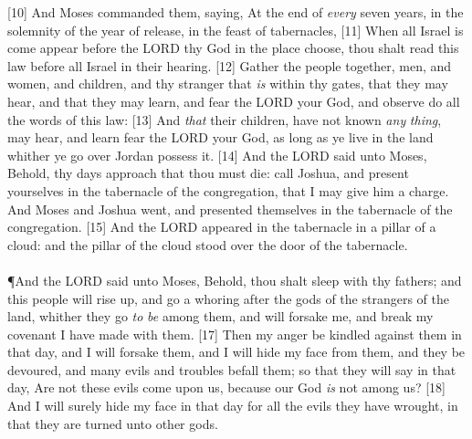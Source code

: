 [10] \textcolor[cmyk]{0.99998,1,0,0}{And Moses commanded them, saying, At the end of \emph{every} seven years, in the solemnity of the year of release, in the feast of tabernacles,}
[11] \textcolor[cmyk]{0.99998,1,0,0}{When all Israel is come   appear before the LORD thy God in the place      choose, thou shalt read this law before all Israel in their hearing.}
[12] \textcolor[cmyk]{0.99998,1,0,0}{Gather the people together, men, and women, and children, and thy stranger that \emph{is} within thy gates, that they may hear, and that they may learn, and fear the LORD your God, and observe   do all the words of this law:}
[13] \textcolor[cmyk]{0.99998,1,0,0}{And \emph{that} their children,    have not known \emph{any} \emph{thing}, may hear, and learn   fear the LORD your God, as long as ye live in the land whither ye go over Jordan   possess it.}
[14] \textcolor[cmyk]{0.99998,1,0,0}{And the LORD said unto Moses, Behold, thy days approach that thou must die: call Joshua, and present yourselves in the tabernacle of the congregation, that I may give him a charge. And Moses and Joshua went, and presented themselves in the tabernacle of the congregation.}
[15] \textcolor[cmyk]{0.99998,1,0,0}{And the LORD appeared in the tabernacle in a pillar of a cloud: and the pillar of the cloud stood over the door of the tabernacle.}\\
\\
\P \textcolor[cmyk]{0.99998,1,0,0}{And the LORD said unto Moses, Behold, thou shalt sleep with thy fathers; and this people will rise up, and go a whoring after the gods of the strangers of the land, whither they go \emph{to} \emph{be} among them, and will forsake me, and break my covenant    I have made with them.}
[17] \textcolor[cmyk]{0.99998,1,0,0}{Then my anger  be kindled against them in that day, and I will forsake them, and I will hide my face from them, and they  be devoured, and many evils and troubles  befall them; so that they will say in that day, Are not these evils come upon us, because our God \emph{is} not among us?}
[18] \textcolor[cmyk]{0.99998,1,0,0}{And I will surely hide my face in that day for all the evils    they  have wrought, in that they are turned unto other gods.}
